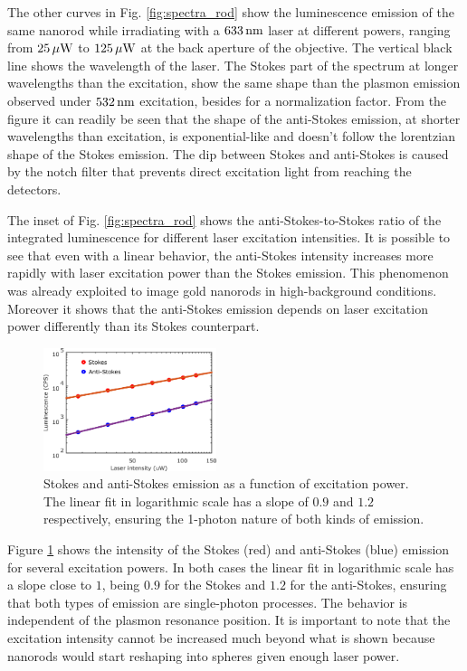 The other curves in Fig. \ref{fig:spectra_rod} show the luminescence emission of
the same nanorod while irradiating with a $633\,\textrm{nm}$ laser at different powers,
ranging from $25\,\mu\textrm{W}$ to $125\,\mu\textrm{W}$ at the back aperture of the objective. The
vertical black line shows the wavelength of the laser. The Stokes part of the
spectrum at longer wavelengths than the excitation, show the same shape than the
plasmon emission observed under $532\,\textrm{nm}$ excitation, besides for a normalization
factor. From the figure it can readily be seen that the shape of the anti-Stokes
emission, at shorter wavelengths than excitation, is exponential-like and
doesn't follow the lorentzian shape of the Stokes emission. The dip between
Stokes and anti-Stokes is caused by the notch filter that prevents direct
excitation light from reaching the detectors.

The inset of Fig. \ref{fig:spectra_rod} shows the anti-Stokes-to-Stokes ratio of
the integrated luminescence for different laser excitation intensities. It is
possible to see that even with a linear behavior, the anti-Stokes intensity
increases more rapidly with laser excitation power than the Stokes emission.
This phenomenon was already exploited to image gold nanorods in high-background
conditions. Moreover it shows that the anti-Stokes emission depends on
laser excitation power differently than its Stokes counterpart. 

\begin{figure}[htp] \centering
\includegraphics[width=0.45\textwidth]{Chapters/04_Anti-Stokes/Figures/Supplementary/01_AS_S_in_Log/01_AS_S_in_Log.png}
\caption{Stokes and anti-Stokes emission as a function of excitation power. The
linear fit in logarithmic scale has a slope of $0.9$ and $1.2$ respectively,
ensuring the 1-photon nature of both kinds of emission.}
	\label{fig:Log_Plot}
\end{figure}

Figure \ref{fig:Log_Plot} shows the intensity of the Stokes (red) and
anti-Stokes (blue) emission for several excitation powers. In both cases the
linear fit in logarithmic scale has a slope close to $1$, being $0.9$ for the
Stokes and $1.2$ for the anti-Stokes, ensuring that both types of emission are
single-photon processes. The behavior is independent of the plasmon resonance
position. It is important to note that the excitation intensity cannot be
increased much beyond what is shown because nanorods would start reshaping into
spheres given enough laser power.

